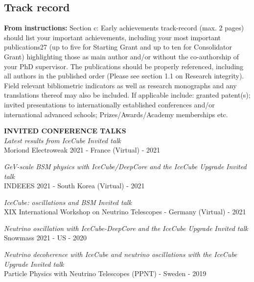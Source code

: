 \documentclass[a4paper,11pt]{article}
\renewcommand{\smallskip} {\vspace{0.1in}}
\begin{document}

\newpage

\subsection{Track record}


\textbf{From instructions:} Section c: Early achievements track-record (max. 2 pages) should list your important achievements,
including your most important publications27 (up to five for Starting Grant and up to ten for
Consolidator Grant) highlighting those as main author and/or without the co-authorship of your PhD
supervisor. The publications should be properly referenced, including all authors in the published
order (Please see section 1.1 on Research integrity). Field relevant bibliometric indicators as well as
research monographs and any translations thereof may also be included. If applicable include:
granted patent(s); invited presentations to internationally established conferences and/or
international advanced schools; Prizes/Awards/Academy memberships etc. 

\textbf{INVITED CONFERENCE TALKS ~~\hrulefill}\smallskip\\
%
{\it Latest results from IceCube} \hfill {\em Invited talk} \\ 
 Moriond Electroweak 2021 - France (Virtual) - 2021
 
 {\it GeV-scale BSM physics with IceCube/DeepCore and the IceCube Upgrade} \hfill {\em Invited talk} \\ 
 INDEEES 2021 - South Korea (Virtual) - 2021

 {\it IceCube: oscillations and BSM} \hfill {\em Invited talk} \\ 
 XIX International Workshop on Neutrino Telescopes - Germany (Virtual) - 2021
 
{\it Neutrino oscillation with IceCube-DeepCore and the IceCube Upgrade} \hfill {\em Invited talk} \\ 
 Snowmass 2021 - US - 2020
 
{\it Neutrino decoherence with IceCube and neutrino oscillations with the IceCube Upgrade} \hfill {\em Invited talk} \\ 
 Particle Physics with Neutrino Telescopes (PPNT) - Sweden - 2019
 
\end{document}
